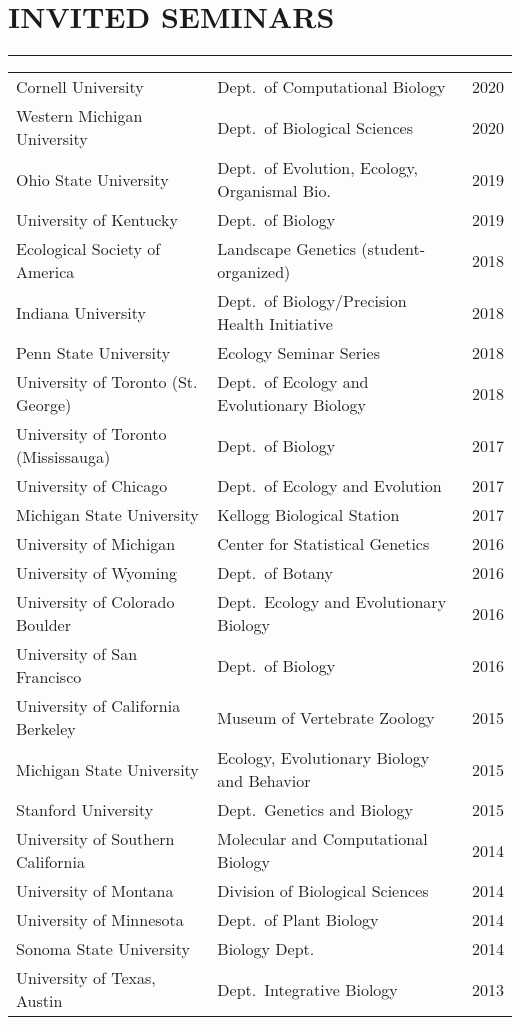 \documentclass{article}
\begin{document}
\section*{INVITED SEMINARS}
\vspace{-0.6cm}
\rule{470pt}{0.4pt}
%
\begin{longtable}{>{\everypar{\hangindent1cm}}p{}p{}p{}}
%
%
Cornell University & Dept.\ of Computational Biology & \hfill 2020 \\
%
Western Michigan University & Dept.\ of Biological Sciences & \hfill 2020 \\
%
Ohio State University & Dept.\ of Evolution, Ecology, Organismal Bio. & \hfill 2019 \\
%
University of Kentucky & Dept.\ of Biology & \hfill 2019 \\
%
Ecological Society of America & Landscape Genetics (student-organized) & \hfill 2018 \\
%
Indiana University & Dept.\ of Biology/Precision Health Initiative & \hfill 2018 \\
%
Penn State University & Ecology Seminar Series & \hfill 2018 \\
%
University of Toronto (St. George) & Dept.\ of Ecology and Evolutionary Biology & \hfill 2018 \\
%
University of Toronto (Mississauga) & Dept.\ of Biology & \hfill 2017 \\
%
University of Chicago & Dept.\ of Ecology and Evolution & \hfill 2017 \\
%
Michigan State University & Kellogg Biological Station & \hfill 2017 \\
%
University of Michigan & Center for Statistical Genetics & \hfill 2016 \\
%
University of Wyoming & Dept.\ of Botany & \hfill 2016 \\
%
University of Colorado Boulder & Dept.\ Ecology and Evolutionary Biology & \hfill 2016 \\
%
University of San Francisco & Dept.\ of Biology & \hfill 2016 \\
%
University of California Berkeley & Museum of Vertebrate Zoology & \hfill 2015 \\
%
Michigan State University & Ecology, Evolutionary Biology and Behavior & \hfill 2015 \\
%
Stanford University & Dept.\ Genetics and Biology & \hfill 2015 \\
%
University of Southern California & Molecular and Computational Biology & \hfill 2014 \\
%
University of Montana & Division of Biological Sciences & \hfill 2014 \\
%
University of Minnesota & Dept.\ of Plant Biology & \hfill 2014 \\
%
Sonoma State University & Biology Dept.\ & \hfill 2014 \\
%
University of Texas, Austin & Dept.\ Integrative Biology & \hfill 2013 \\
%
\end{longtable}
%
\end{document}

